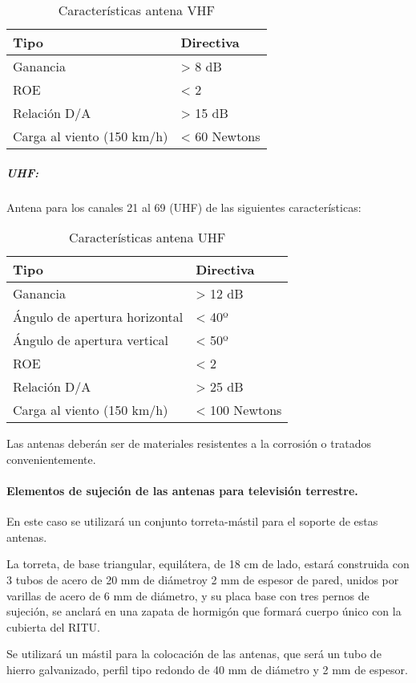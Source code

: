 \begin{table}[H]
\caption{Características antena VHF}
\centering
\label{antvhf}
\begin{tabular}{l l}
    Tipo & Directiva\\
    \hline
    \hline
    Ganancia & > 8 dB\\
    ROE &  < 2 \\
    Relación D/A & > 15 dB \\
    Carga al viento (150 km/h) & < 60 Newtons
\end{tabular}
\end{table}

\subparagraph*{UHF: }

Antena para los canales 21 al 69 (UHF) de las siguientes características: 

\begin{table}[H]
\caption{Características antena UHF}
\centering
\label{antuhf}
\begin{tabular}{l l}
    Tipo & Directiva\\
    \hline
    \hline
    Ganancia & > 12 dB\\
    Ángulo de apertura horizontal & < 40º\\
    Ángulo de apertura vertical & < 50º\\
    ROE &  < 2 \\
    Relación D/A & > 25 dB \\
    Carga al viento (150 km/h) & < 100 Newtons
\end{tabular}
\end{table}

Las antenas deberán ser de materiales resistentes a la corrosión o tratados convenientemente.

\paragraph{Elementos de sujeción de las antenas para televisión terrestre.}

En este caso se utilizará un conjunto torreta-mástil para el soporte de estas antenas.

La torreta, de base triangular, equilátera, de 18 cm de lado, estará construida con 3 tubos de acero de 20 mm de diámetroy 2 mm de espesor de pared, unidos por varillas de acero de 6 mm de diámetro, y su placa base con tres pernos de sujeción, se anclará en una zapata de hormigón que formará cuerpo único con la cubierta del RITU.

Se utilizará un mástil para la colocación de las antenas, que será un tubo de hierro galvanizado, perfil tipo redondo de 40 mm de diámetro y 2 mm de espesor.

